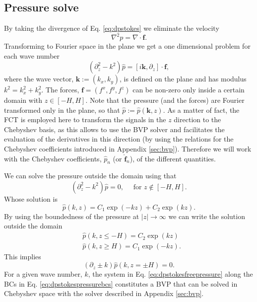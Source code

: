 \documentclass[twoside,openright,titlepage,numbers=noenddot,%
headinclude,footinclude,cleardoublepage=empty,abstract=on,
BCOR=5mm,fontsize=11pt, dvipsnames, paper=b5
]{scrreprt}
\renewcommand{\vec}[1]{\bm{#1}}
\newcommand{\fou}[1]{\widehat{#1}}
\begin{document}
\subsection*{Pressure solve}
By taking the divergence of Eq. \eqref{eq:dpstokes} we eliminate the velocity
\begin{equation}
  \label{eq:dpstokespressure}
  \nabla^2 p = \nabla\cdot\vec{f}.
\end{equation}
Transforming to Fourier space in the plane we get a one dimensional problem for each wave number
\begin{equation}
  \label{eq:dpstokesfreepressure}
  (\partial^2_{z}-k^2)\fou{p} =
  \left[
    i\vec{k},
    \partial_z\right]
  \cdot\vec{f},
\end{equation}
where the wave vector, $\vec{k}:=(k_x, k_y)$, is defined on the plane and has modulus $k^2 = k_x^2 + k_y^2$. The forces, $\vec{f}=(f^x, f^y, f^z)$ can be non-zero only inside a certain domain with $z\in [-H,H]$. Note that the pressure (and the forces) are Fourier transformed only in the plane, so that $\fou{p} :=\fou{p}(\vec{k}, z)$. As a matter of fact, the \gls{FCT} is employed here to transform the signals in the $z$ direction to the Chebyshev basis, as this allows to use the \gls{BVP} solver and facilitates the evaluation of the derivatives in this direction (by using the relations for the Chebyshev coefficients introduced in Appendix \ref{sec:bvp}). Therefore we will work with the Chebyshev coefficients, $\fou{p}_n$ (or $\fou{\vec{f}}_n$), of the different quantities.

We can solve the pressure outside the domain using that
\begin{equation}
    (\partial^2_{z}-k^2)\fou{p} = 0, \quad \text{ for } z \notin [-H,H].
\end{equation}
Whose solution is
\begin{equation}
  \fou{p}(k, z) = C_1\exp(-kz) + C_2\exp(kz).
\end{equation}
By using the boundedness of the pressure at $|z|\rightarrow\infty$ we can write the solution outside the domain
\begin{equation}
  \begin{aligned}
    &\fou{p}(k,z\le -H) = C_2\exp(kz)\\
    &\fou{p}(k,z\ge H) = C_1\exp(-kz).
  \end{aligned}
\end{equation}
This implies
\begin{equation}
  \label{eq:dpstokespressurebcs}
  (\partial_z\pm k)\fou{p}(k, z=\pm H) = 0.
\end{equation}
For a given wave number, $k$, the system in Eq. \eqref{eq:dpstokesfreepressure} along the \glspl{BC} in Eq. \eqref{eq:dpstokespressurebcs} constitutes a \gls{BVP} that can be solved in Chebyshev space with the solver described in Appendix \ref{sec:bvp}.
\end{document}
